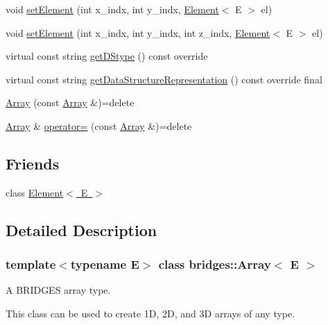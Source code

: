 \begin{DoxyCompactItemize}
\item 
void \mbox{\hyperlink{classbridges_1_1_array_a428cc76d22af71c5ae57dc293780b8ec}{set\+Element}} (int x\+\_\+indx, int y\+\_\+indx, \mbox{\hyperlink{classbridges_1_1_element}{Element}}$<$ E $>$ el)
\item 
void \mbox{\hyperlink{classbridges_1_1_array_a526c3a190b48a338541e5b4667c5eedf}{set\+Element}} (int x\+\_\+indx, int y\+\_\+indx, int z\+\_\+indx, \mbox{\hyperlink{classbridges_1_1_element}{Element}}$<$ E $>$ el)
\item 
virtual const string \mbox{\hyperlink{classbridges_1_1_array_ab93f7379870a7c0bc63490c53d95ba09}{get\+D\+Stype}} () const override
\item 
virtual const string \mbox{\hyperlink{classbridges_1_1_array_a12fe4db83918741620574b9c07fa62b0}{get\+Data\+Structure\+Representation}} () const override final
\item 
\mbox{\hyperlink{classbridges_1_1_array_a3229045173ac984ca452e613b1ce1fa3}{Array}} (const \mbox{\hyperlink{classbridges_1_1_array}{Array}} \&)=delete
\item 
\mbox{\hyperlink{classbridges_1_1_array}{Array}} \& \mbox{\hyperlink{classbridges_1_1_array_af8a8b4fc43f57020db39207c80403e6f}{operator=}} (const \mbox{\hyperlink{classbridges_1_1_array}{Array}} \&)=delete
\end{DoxyCompactItemize}
\subsection*{Friends}
\begin{DoxyCompactItemize}
\item 
class \mbox{\hyperlink{classbridges_1_1_array_a8c6ff2a8dd3e27346dd25f588a78828a}{Element$<$ E $>$}}
\end{DoxyCompactItemize}


\subsection{Detailed Description}
\subsubsection*{template$<$typename E$>$\newline
class bridges\+::\+Array$<$ E $>$}

A B\+R\+I\+D\+G\+ES array type. 

This class can be used to create 1D, 2D, and 3D arrays of any type.

